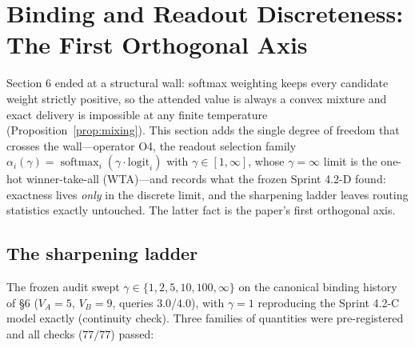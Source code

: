 \section{Binding and Readout Discreteness: The First Orthogonal Axis}
\label{sec:wta}

Section 6 ended at a structural wall: softmax weighting keeps every
candidate weight strictly positive, so the attended value is always a
convex mixture and exact delivery is impossible at any finite temperature
(Proposition~\ref{prop:mixing}). This section adds the single degree of
freedom that crosses the wall---operator O4, the readout selection family
$\alpha_i(\gamma)=\operatorname{softmax}_i(\gamma\cdot\mathrm{logit}_i)$
with $\gamma\in[1,\infty]$, whose $\gamma=\infty$ limit is the one-hot
winner-take-all (WTA)---and records what the frozen Sprint 4.2-D found:
exactness lives \emph{only} in the discrete limit, and the sharpening
ladder leaves routing statistics exactly untouched. The latter fact is the
paper's first orthogonal axis.

\subsection{The sharpening ladder}
\label{sec:gammaladder}

The frozen audit swept $\gamma\in\{1,2,5,10,100,\infty\}$ on the canonical
binding history of §6 ($V_A=5$, $V_B=9$, queries $3.0$/$4.0$), with
$\gamma=1$ reproducing the Sprint 4.2-C model exactly (continuity check).
Three families of quantities were pre-registered and all checks ($77/77$)
passed:

